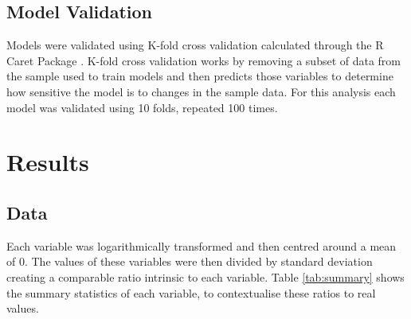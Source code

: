 \documentclass[review,12pt,authoryear]{elsarticle}
\begin{document}
\begin{linenumbers}
\subsection{Model Validation}
Models were validated using K-fold cross validation calculated through the R Caret Package \citep{kuhnBuildingPredictiveModels2008}. K-fold cross validation works by removing a subset of data from the sample used to train models and then predicts those variables to determine how sensitive the model is to changes in the sample data. For this analysis each model was validated using 10 folds, repeated 100 times.
\section{Results}
\subsection{Data}
Each variable was logarithmically transformed and then centred around a mean of 0. The values of these variables were then divided by standard deviation creating a comparable ratio intrinsic to each variable. Table \ref{tab:summary} shows the summary statistics of each variable, to contextualise these ratios to real values.


\end{linenumbers}
\end{document}
